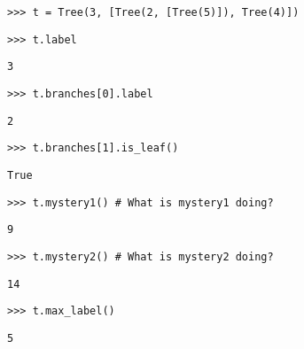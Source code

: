 \begin{blocksection}

\begin{lstlisting}
>>> t = Tree(3, [Tree(2, [Tree(5)]), Tree(4)])
\end{lstlisting}

\begin{lstlisting}
>>> t.label
\end{lstlisting}
\begin{solution}[.5in]
\begin{lstlisting}
3
\end{lstlisting}
\end{solution}

\begin{lstlisting}
>>> t.branches[0].label
\end{lstlisting}
\begin{solution}[.5in]
\begin{lstlisting}
2
\end{lstlisting}
\end{solution}

\begin{lstlisting}
>>> t.branches[1].is_leaf()
\end{lstlisting}
\begin{solution}[.5in]
\begin{lstlisting}
True
\end{lstlisting}
\end{solution}

\begin{lstlisting}
>>> t.mystery1() # What is mystery1 doing?
\end{lstlisting}
\begin{solution}[.5in]
\begin{lstlisting}
9
\end{lstlisting}
\end{solution}

\begin{lstlisting}
>>> t.mystery2() # What is mystery2 doing?
\end{lstlisting}
\begin{solution}[.5in]
\begin{lstlisting}
14
\end{lstlisting}
\end{solution}

\begin{lstlisting}
>>> t.max_label()
\end{lstlisting}
\begin{solution}[.5in]
\begin{lstlisting}
5
\end{lstlisting}
\end{solution}


\end{blocksection}
